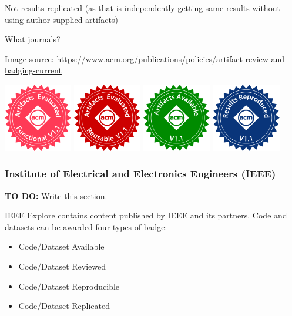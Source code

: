 Not results replicated (as that is independently getting same results without using author-supplied artifacts)

What journals?

Image source: \url{https://www.acm.org/publications/policies/artifact-review-and-badging-current}

\includegraphics[width=3cm]{images/artifacts_evaluated_functional_v1_1.png}
\includegraphics[width=3cm]{images/artifacts_evaluated_reusable_v1_1.png}
\includegraphics[width=3cm]{images/artifacts_available_v1_1.png}
\includegraphics[width=3cm]{images/results_reproduced_v1_1.png}

\subsubsection{Institute of Electrical and Electronics Engineers (IEEE)}

\textbf{TO DO:} Write this section.

IEEE Explore contains content published by IEEE and its partners. Code and datasets can be awarded four types of badge:

\begin{itemize}
    \item Code/Dataset Available
    \item Code/Dataset Reviewed
    \item Code/Dataset Reproducible
    \item Code/Dataset Replicated
\end{itemize}

